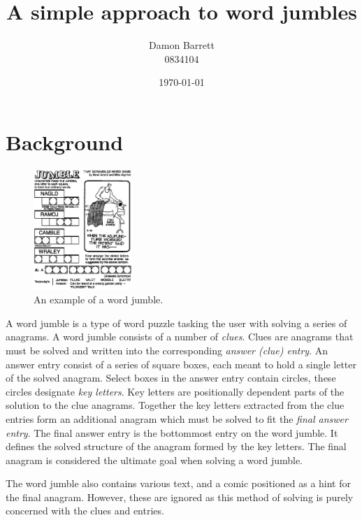 \documentclass{article}
\title{A simple approach to word jumbles}
\author{Damon Barrett \\ 0834104}
\date{\today}
\begin{document}
	\maketitle
	\newpage 
	
	\tableofcontents
	\listoffigures
	\newpage 
	
	\section{Background}
	
	\begin{figure}
		\centering
		\includegraphics[width=0.33\textwidth]{j1.png}
		\caption{An example of a word jumble.}
	\end{figure}
	
	A word jumble is a type of word puzzle tasking the user with solving a series of anagrams.  A word jumble consists of a number of \textit{clues}.  Clues are anagrams that must be solved and written into the corresponding \textit{answer (clue) entry}.  An answer entry consist of a series of square boxes, each meant to hold a single letter of the solved anagram.  Select boxes in the answer entry contain circles, these circles designate \textit{key letters}.  Key letters are positionally dependent parts of the solution to the clue anagrams.  Together the key letters extracted from the clue entries form an additional anagram which must be solved to fit the \textit{final answer entry}.  The final answer entry is the bottommost entry on the word jumble. It defines the solved structure of the anagram formed by the key letters.  The final anagram is considered the ultimate goal when solving a word jumble. \par
	The word jumble also contains various text, and a comic positioned as a hint for the final anagram.  However, these are ignored as this method of solving is purely concerned with the clues and entries. \par 
	
\end{document}
